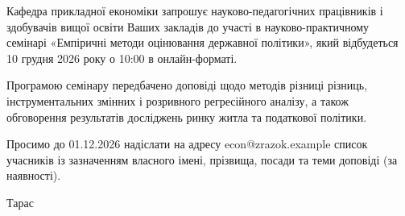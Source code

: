 \documentclass[14pt,onehalf]{dstu4163}
\begin{document}


Кафедра прикладної економіки запрошує науково-педагогічних працівників
і здобувачів вищої освіти Ваших закладів до участі в науково-практичному
семінарі «Емпіричні методи оцінювання державної політики», який відбудеться
10 грудня 2026 року о 10:00 в онлайн-форматі.

Програмою семінару передбачено доповіді щодо методів різниці різниць,
інструментальних змінних і розривного регресійного аналізу, а також
обговорення результатів досліджень ринку житла та податкової політики.

Просимо до 01.12.2026 надіслати на адресу econ@zrazok.example список
учасників із зазначенням власного імені, прізвища, посади та теми
доповіді (за наявності).

\signature{Завідувач кафедри}{Тарас }

\end{document}
